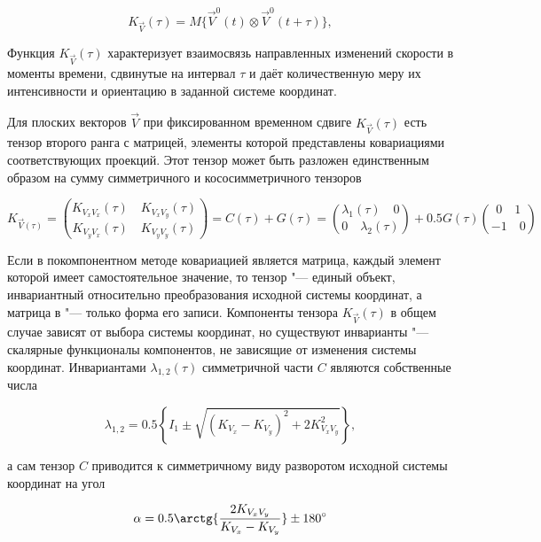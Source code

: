 \begin{equation}
\label{eq:equation3_3}
K_{\vec{V}}(\tau)=M\{\vec{V}^0(t) \otimes \vec{V}^0(t+\tau)\},
\end{equation}

Функция $K_{\vec{V}}(\tau)$ характеризует взаимосвязь направленных изменений скорости в моменты времени, сдвинутые на интервал $\tau$ и даёт количественную меру их интенсивности и ориентацию в заданной системе координат.

Для плоских векторов $\vec{V}$ при фиксированном временном сдвиге $K_{\vec{V}}(\tau)$ есть тензор второго ранга с матрицей, элементы которой представлены ковариациями соответствующих проекций. Этот тензор может быть разложен единственным образом на сумму симметричного и кососимметричного тензоров

\begin{equation}
\label{eq:equation3_4}
{K_{\vec{V}(\tau)} = {{K_{V_{x}V_{x}}(\tau)\quad K_{V_{x}V_{y}}(\tau)}\choose {K_{V_{y}V_{x}}(\tau)\quad  K_{V_{y}V_{y}}(\tau)}}= C(\tau) + G(\tau) ={{{\lambda_{1}(\tau)\quad 0}} \choose 0\quad {\lambda_{2}(\tau)}}} + {0.5G(\tau){{0}\quad {1}\choose {-1}\quad {0}}}
\end{equation}

Если в покомпонентном методе ковариацией является матрица, каждый элемент которой имеет самостоятельное значение, то тензор "--- единый объект, инвариантный относительно преобразования исходной системы координат, а матрица в   "--- только форма его записи. Компоненты тензора $K_{\vec{V}}(\tau)$  в общем случае зависят от выбора системы координат, но существуют инварианты "--- скалярные функционалы компонентов, не зависящие от изменения системы координат. Инвариантами $\lambda_{1,2}(\tau)$ симметричной части $C$ являются собственные числа  

\begin{equation}
\label{eq:equation3_5}
\lambda_{1,2}=0.5 \left\{I_{1}\pm\sqrt{(K_V_{x}-K_V_{y})^2+2K^2_{{V_{x}V_{y}}}} \right\},
\end{equation}   

а сам тензор $C$ приводится к симметричному виду разворотом исходной системы координат на угол

\begin{equation}
\label{eq:equation3_6}
\alpha=0.5\arctg{\frac{2K_{{V_{x}V_{y}}}} {K_{V_{x}}-K_{V_{y}}}}\pm180^{\circ} 
\end{equation}   

